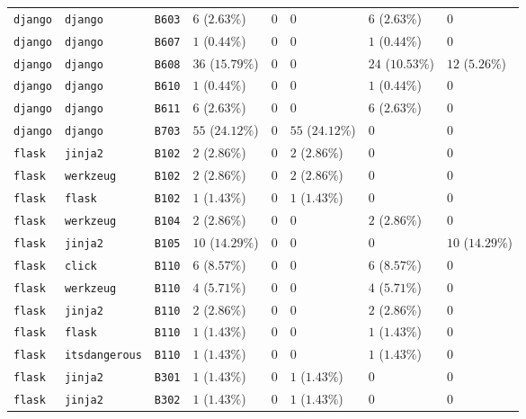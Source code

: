 \begin{table}
\begin{tabular}{llllllll}
\texttt{django} & \texttt{django} & \texttt{B603} & $6$ ($2.63\%$) & $0$ & $0$ & $6$ ($2.63\%$) & $0$ \\
\texttt{django} & \texttt{django} & \texttt{B607} & $1$ ($0.44\%$) & $0$ & $0$ & $1$ ($0.44\%$) & $0$ \\
\texttt{django} & \texttt{django} & \texttt{B608} & $36$ ($15.79\%$) & $0$ & $0$ & $24$ ($10.53\%$) & $12$ ($5.26\%$) \\
\texttt{django} & \texttt{django} & \texttt{B610} & $1$ ($0.44\%$) & $0$ & $0$ & $1$ ($0.44\%$) & $0$ \\
\texttt{django} & \texttt{django} & \texttt{B611} & $6$ ($2.63\%$) & $0$ & $0$ & $6$ ($2.63\%$) & $0$ \\
\texttt{django} & \texttt{django} & \texttt{B703} & $55$ ($24.12\%$) & $0$ & $55$ ($24.12\%$) & $0$ & $0$ \\
\texttt{flask} & \texttt{jinja2} & \texttt{B102} & $2$ ($2.86\%$) & $0$ & $2$ ($2.86\%$) & $0$ & $0$ \\
\texttt{flask} & \texttt{werkzeug} & \texttt{B102} & $2$ ($2.86\%$) & $0$ & $2$ ($2.86\%$) & $0$ & $0$ \\
\texttt{flask} & \texttt{flask} & \texttt{B102} & $1$ ($1.43\%$) & $0$ & $1$ ($1.43\%$) & $0$ & $0$ \\
\texttt{flask} & \texttt{werkzeug} & \texttt{B104} & $2$ ($2.86\%$) & $0$ & $0$ & $2$ ($2.86\%$) & $0$ \\
\texttt{flask} & \texttt{jinja2} & \texttt{B105} & $10$ ($14.29\%$) & $0$ & $0$ & $0$ & $10$ ($14.29\%$) \\
\texttt{flask} & \texttt{click} & \texttt{B110} & $6$ ($8.57\%$) & $0$ & $0$ & $6$ ($8.57\%$) & $0$ \\
\texttt{flask} & \texttt{werkzeug} & \texttt{B110} & $4$ ($5.71\%$) & $0$ & $0$ & $4$ ($5.71\%$) & $0$ \\
\texttt{flask} & \texttt{jinja2} & \texttt{B110} & $2$ ($2.86\%$) & $0$ & $0$ & $2$ ($2.86\%$) & $0$ \\
\texttt{flask} & \texttt{flask} & \texttt{B110} & $1$ ($1.43\%$) & $0$ & $0$ & $1$ ($1.43\%$) & $0$ \\
\texttt{flask} & \texttt{itsdangerous} & \texttt{B110} & $1$ ($1.43\%$) & $0$ & $0$ & $1$ ($1.43\%$) & $0$ \\
\texttt{flask} & \texttt{jinja2} & \texttt{B301} & $1$ ($1.43\%$) & $0$ & $1$ ($1.43\%$) & $0$ & $0$ \\
\texttt{flask} & \texttt{jinja2} & \texttt{B302} & $1$ ($1.43\%$) & $0$ & $1$ ($1.43\%$) & $0$ & $0$ \\

\end{tabular}
\end{table}
